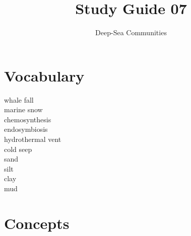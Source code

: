 \documentclass[nofonts, letterpaper]{tufte-handout}
\title{Study Guide 07}
\author{Deep-Sea Communities}
\date{} %
\begin{document}
\maketitle	%


\section{Vocabulary}
\vspace{-1\baselineskip}
\begin{multicols}{2}
whale fall \\
marine snow \\
chemosynthesis \\
endosymbiosis \\
hydrothermal vent \\
cold seep \\
sand \\
silt \\
clay \\
mud 
\end{multicols}

\section{Concepts}
\end{document}
